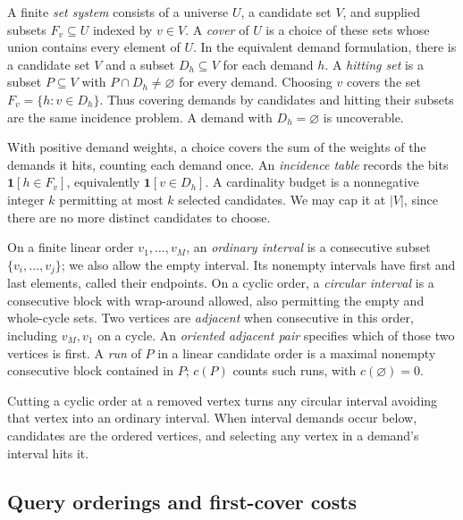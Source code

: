 \begin{definition}\label{def:covers-and-hitting}
A finite \emph{set system} consists of a universe $U$, a candidate
set $V$, and supplied subsets $F_v\subseteq U$ indexed by $v\in V$.
A \emph{cover} of $U$ is a choice of these sets whose union contains
every element of $U$.
In the equivalent demand formulation, there is a candidate set $V$
and a subset $D_h\subseteq V$ for each demand $h$. A \emph{hitting
set} is a subset $P\subseteq V$ with $P\cap D_h\ne\varnothing$
for every demand. Choosing $v$ covers the set
$F_v=\{h:v\in D_h\}$. Thus covering demands by candidates and
hitting their subsets are the same incidence problem.
A demand with $D_h=\varnothing$ is uncoverable.
\end{definition}

With positive demand weights, a choice covers the sum of the weights
of the demands it hits, counting each demand once. An
\emph{incidence table} records the bits
$\mathbf1[h\in F_v]$, equivalently $\mathbf1[v\in D_h]$.
A cardinality budget is a nonnegative integer $k$ permitting at
most $k$ selected candidates. We may cap it at $|V|$, since there
are no more distinct candidates to choose.

\begin{definition}\label{def:ordered-intervals}
On a finite linear order $v_1,\ldots,v_M$, an \emph{ordinary
interval} is a consecutive subset $\{v_i,\ldots,v_j\}$; we also
allow the empty interval. Its nonempty intervals have first and
last elements, called their endpoints.
On a cyclic order, a \emph{circular interval} is a consecutive
block with wrap-around allowed, also permitting the empty and
whole-cycle sets. Two vertices are \emph{adjacent} when consecutive
in this order, including $v_M,v_1$ on a cycle. An \emph{oriented
adjacent pair} specifies which of those two vertices is first.
A \emph{run} of $P$ in a linear candidate order is a maximal
nonempty consecutive block contained in $P$; $c(P)$ counts such
runs, with $c(\varnothing)=0$.
\end{definition}

Cutting a cyclic order at a removed vertex turns any circular
interval avoiding that vertex into an ordinary interval.
When interval demands occur below, candidates are the ordered
vertices, and selecting any vertex in a demand's interval hits it.

\subsection{Query orderings and first-cover costs}

